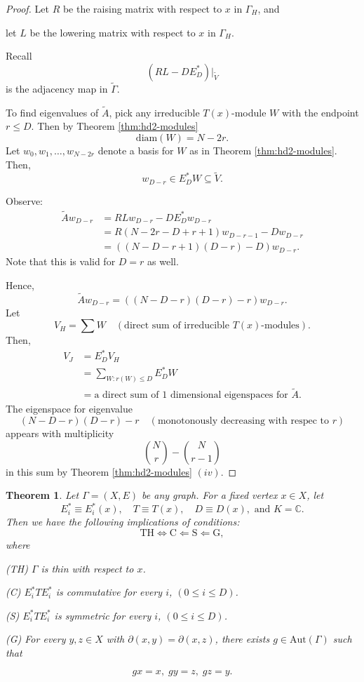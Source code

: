 \documentclass[
]{book}
\newtheorem{theorem}{Theorem}[chapter]
\theoremstyle{definition}
\theoremstyle{definition}
\theoremstyle{definition}
\theoremstyle{definition}
\theoremstyle{remark}
\begin{document}
\begin{proof}
Let \(R\) be the raising matrix with respect to \(x\) in \(\Gamma_H\), and

let \(L\) be the lowering matrix with respect to \(x\) in \(\Gamma_H\).

Recall
\[(RL - DE^*_D) |_{\tilde{V}}\]
is the adjacency map in \(\tilde{\Gamma}\).

To find eigenvalues of \(\tilde{A}\), pick any irreducible \(T(x)\)-module \(W\) with the endpoint \(r\leq D\). Then by Theorem \ref{thm:hd2-modules}
\[\text{diam}(W) = N-2r.\]
Let \(w_0, w_1, \ldots, w_{N-2r}\) denote a basis for \(W\) as in Theorem \ref{thm:hd2-modules}. Then,
\[w_{D-r} \in E^*_DW \subseteq \tilde{V}.\]

Observe:
\begin{align}
\tilde{A}w_{D-r} & = RLw_{D-r} - DE_D^*w_{D-r}\\
& = R(N-2r-D+r+1)w_{D-r-1} - Dw_{D-r}\\
& = ((N-D-r+1)(D-r) - D)w_{D-r}.
\end{align}
Note that this is valid for \(D = r\) as well.

Hence,
\[\tilde{A}w_{D-r}  = ((N-D-r)(D-r)-r)w_{D-r}.\]
Let
\[V_H = \sum W \quad (\text{direct sum of irreducible }T(x)\text{-modules}).\]
Then,
\begin{align}
V_J & = E_D^*V_H\\
& = \sum_{W:r(W)\leq D} E_D^*W\\
& = \text{a direct sum of 1 dimensional eigenspaces for }\tilde{A}.
\end{align}
The eigenspace for eigenvalue
\[(N-D-r)(D-r)-r \quad (\text{monotonously decreasing with respec to }r)\]
appears with multiplicity
\[\binom{N}{r} - \binom{N}{r-1}\]
in this sum by Theorem \ref{thm:hd2-modules} \((iv)\).
\end{proof}

\begin{theorem}
\protect\hypertarget{thm:thin-condition}{}\label{thm:thin-condition}Let \(\Gamma = (X, E)\) be any graph. For a fixed vertex \(x\in X\), let
\[E_i^*\equiv E_i^*(x), \quad T\equiv T(x), \quad D \equiv D(x), \text{ and } K = \mathbb{C}.\]
Then we have the following implications of conditions:
\[\text{TH} \Leftrightarrow \text{C} \Leftarrow \text{S} \Leftarrow \text{G},\]
where

(TH) \(\Gamma\) is thin with respect to \(x\).

(C) \(E^*_iTE^*_i\) is commutative for every \(i\), \((0\leq i \leq D)\).

(S) \(E^*_iTE^*_i\) is symmetric for every \(i\), \((0\leq i \leq D)\).

(G) For every \(y, z\in X\) with \(\partial(x,y) = \partial(x,z)\), there exists \(g\in \mathrm{Aut}(\Gamma)\) such that

\[gx = x, \; gy = z, \; gz = y.\]
\end{theorem}
\end{document}
